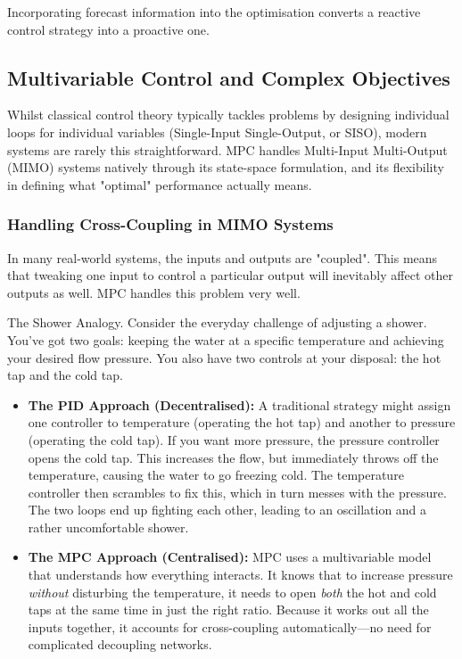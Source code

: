 Incorporating forecast information into the optimisation converts a reactive control strategy into a proactive one.

\subsection{Multivariable Control and Complex Objectives}

Whilst classical control theory typically tackles problems by designing individual loops for individual variables (Single-Input Single-Output, or SISO), modern systems are rarely this straightforward. MPC handles Multi-Input Multi-Output (MIMO) systems natively through its state-space formulation, and its flexibility in defining what "optimal" performance actually means.

\subsubsection{Handling Cross-Coupling in MIMO Systems}
\label{sec:shower_analogy}
In many real-world systems, the inputs and outputs are "coupled". This means that tweaking one input to control a particular output will inevitably affect other outputs as well. MPC handles this problem very well. 

\begin{examplebox}{The Shower Analogy.}
	Consider the everyday challenge of adjusting a shower. You've got two goals: keeping the water at a specific temperature and achieving your desired flow pressure. You also have two controls at your disposal: the hot tap and the cold tap.
	
	\begin{itemize}
		\item \textbf{The PID Approach (Decentralised):} A traditional strategy might assign one controller to temperature (operating the hot tap) and another to pressure (operating the cold tap). If you want more pressure, the pressure controller opens the cold tap. This increases the flow, but immediately throws off the temperature, causing the water to go freezing cold. The temperature controller then scrambles to fix this, which in turn messes with the pressure. The two loops end up fighting each other, leading to an oscillation and a rather uncomfortable shower.
		
		\item \textbf{The MPC Approach (Centralised):} MPC uses a multivariable model that understands how everything interacts. It knows that to increase pressure \textit{without} disturbing the temperature, it needs to open \textit{both} the hot and cold taps at the same time in just the right ratio. Because it works out all the inputs together, it accounts for cross-coupling automatically—no need for complicated decoupling networks.
	\end{itemize}
\end{examplebox}

